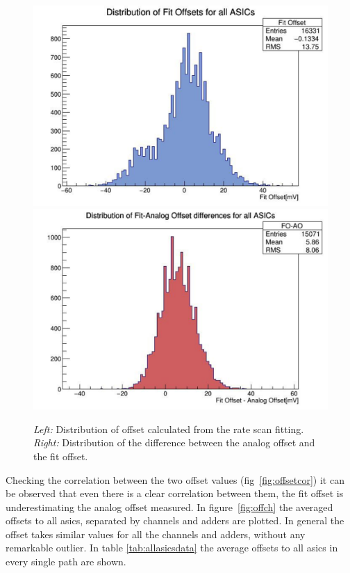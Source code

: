 \documentclass[main.tex]{subfiles}
\begin{document}
\begin{figure}
  \centering
  \includegraphics[width=\textwidth]{./Pictures/fitoffsetdist.pdf}
  \endminipage
  \includegraphics[width=\textwidth]{./Pictures/diffoffsetdif.pdf}
  \endminipage
  \caption{\textit{Left:} Distribution of offset calculated from the rate scan fitting. \textit{Right:} Distribution of the difference between the analog offset and the fit offset.}
  \label{fig:fitoffdist}
\end{figure}
Checking the correlation between the two offset values (fig~\ref{fig:offsetcor}) it can be observed that even there is a clear correlation between them, the fit offset is underestimating the analog offset measured.
In figure~\ref{fig:offch} the averaged offsets to all \glspl{asic}, separated by channels and adders are plotted. In general the offset takes similar values for all the channels and adders, without any remarkable outlier.
In table \ref{tab:allasicsdata} the average offsets to all \glspl{asic} in every single path are shown.
\end{document}
